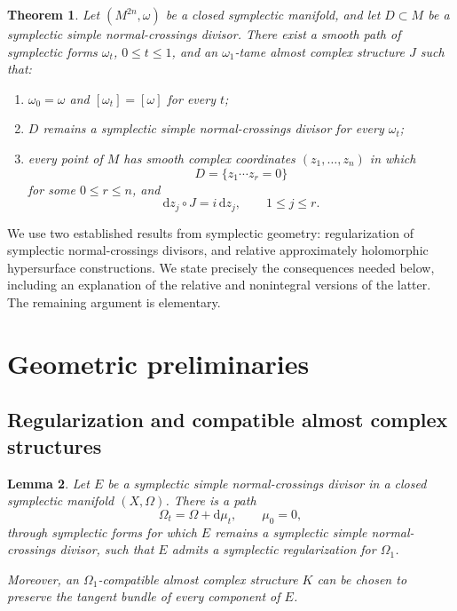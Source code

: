 \documentclass[11pt]{article}
\newtheorem{theorem}{Theorem}[section]
\newtheorem{lemma}[theorem]{Lemma}
\theoremstyle{definition}
\theoremstyle{remark}
\newcommand{\dd}{\mathrm d}
\begin{document}
\begin{theorem}\label{thm:main}
Let $(M^{2n},\omega)$ be a closed symplectic manifold, and let
$D\subset M$ be a symplectic simple normal-crossings divisor.
There exist a smooth path of symplectic forms $\omega_t$, $0\leq t\leq1$,
and an $\omega_1$-tame almost complex structure $J$ such that:
\begin{enumerate}[label=\textup{(\roman*)}]
\item $\omega_0=\omega$ and $[\omega_t]=[\omega]$ for every $t$;
\item $D$ remains a symplectic simple normal-crossings divisor for
      every $\omega_t$;
\item every point of $M$ has smooth complex coordinates
      $(z_1,\ldots,z_n)$ in which
      \[
      D=\{z_1\cdots z_r=0\}
      \]
      for some $0\leq r\leq n$, and
      \[
      \dd z_j\circ J=i\,\dd z_j,\qquad 1\leq j\leq r.
      \]
\end{enumerate}
\end{theorem}

We use two established results from symplectic geometry:
regularization of symplectic normal-crossings divisors, and relative
approximately holomorphic hypersurface constructions.  We state
precisely the consequences needed below, including an explanation of
the relative and nonintegral versions of the latter.  The remaining
argument is elementary.

\section{Geometric preliminaries}

\subsection{Regularization and compatible almost complex structures}

\begin{lemma}\label{lem:regularization}
Let $E$ be a symplectic simple normal-crossings divisor in a closed
symplectic manifold $(X,\Omega)$.  There is a path
\[
\Omega_t=\Omega+\dd\mu_t,\qquad \mu_0=0,
\]
through symplectic forms for which $E$ remains a symplectic simple
normal-crossings divisor, such that $E$ admits a symplectic
regularization for $\Omega_1$.

Moreover, an $\Omega_1$-compatible almost complex structure $K$ can
be chosen to preserve the tangent bundle of every component of $E$.
\end{lemma}
\end{document}
